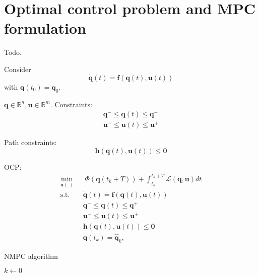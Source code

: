 \section{Optimal control problem and MPC formulation}
Todo.

Consider
\begin{equation*}
    \dot{\bm{q}}(t) = \bm{f}(\bm{q}(t), \bm{u}(t))
\end{equation*}
with $\bm{q}(t_0)=\bm{q}_0$.

$\bm{q}\in\mathbb{R}^n, \bm{u}\in\mathbb{R}^m$. Constraints:
\begin{gather*}
    \bm{q}^- \le \bm{q}(t) \le \bm{q}^+ \\
    \bm{u}^- \le \bm{u}(t) \le \bm{u}^+
\end{gather*}

Path constraints:
\begin{equation*}
    \bm{h}(\bm{q}(t), \bm{u}(t)) \le \bm{0}
\end{equation*}

OCP:
\begin{equation}
    \label{eq:OCP}
    \begin{aligned}
        \min_{\bm{u}(\cdot)} \;\;
            & \; \Phi(\bm{q}(t_k + T)) + \int_{t_k}^{t_k + T} \mathcal{L}(\bm{q}, \bm{u}) dt \\
            \text{s.t. } & \dot{\bm{q}}(t) = \bm{f}(\bm{q}(t), \bm{u}(t)) \\
                         & \bm{q}^- \le \bm{q}(t) \le \bm{q}^+ \\
                         & \bm{u}^- \le \bm{u}(t) \le \bm{u}^+ \\
                         & \bm{h}(\bm{q}(t), \bm{u}(t)) \le \bm{0} \\
                         & \bm{q}(t_k) = \hat{\bm{q}}_k,
    \end{aligned}
\end{equation}

\begin{algorithm}
	\small
	\caption{NMPC algorithm}
	\label{alg:NMPC}
    $k \leftarrow 0$\;
\end{algorithm}

